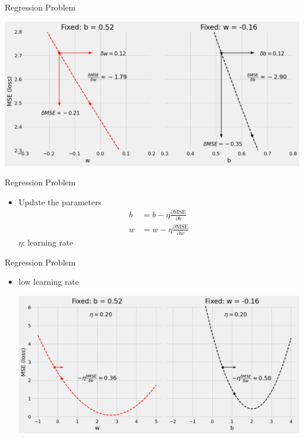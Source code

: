 \documentclass[pdflatex,compress,mathserif]{beamer}
\begin{document}
\begin{frame}{Regression Problem}
	\begin{center}
		\includegraphics[width=\linewidth]{img/09}
	\end{center}
\end{frame}

\begin{frame}{Regression Problem}
	\begin{itemize}
		\item Update the parameters
		$$
		\begin{aligned}
			b &= b - \eta \frac{\partial{\text{MSE}}}{\partial{b}}
			\\
			w &= w - \eta \frac{\partial{\text{MSE}}}{\partial{w}}
		\end{aligned}
		$$
		$\eta$: learning rate
	\end{itemize}
\end{frame}

\begin{frame}{Regression Problem}
	\begin{itemize}
		\item low learning rate
		\begin{center}
			\includegraphics[width=\linewidth]{img/11}
		\end{center}
	\end{itemize}
\end{frame}
\end{document}
